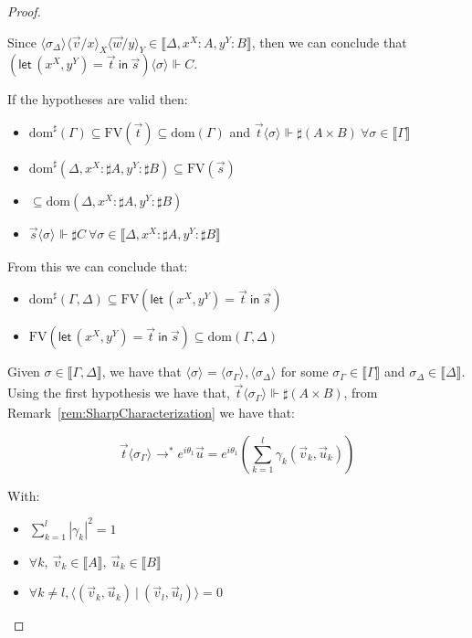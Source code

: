\documentclass[a4paper,UKenglish,numberwithinsect,pdfa,anonymous]{lipics-v2021}
\theoremstyle{restatestyle}
\newcommand\lra{\longrightarrow}
\newcommand\ansubst[2]{\ensuremath{\langle #1 \rangle_{#2}}}
\newcommand\dom[1]{\mathrm{dom}(#1)}
\newcommand\sdom[1]{\mathrm{dom}^{\sharp}(#1)}
\newcommand\FV[1]{\mathrm{FV}(#1)}
\def\scal#1#2{\langle{#1}~|~{#2}\rangle}
\def\Pair#1#2{(#1,#2)} %
\def\letkeyword{\mathsf{let}}
\def\inkeyword{\mathsf{in}}
\def\LetP#1#2#3#4#5#6{\letkeyword\,\Pair{#1^{#2}}{#3^{#4}}=#5~\inkeyword~#6}
\def\eval{\lra^*}
\def\sem#1{\llbracket#1\rrbracket}
\def\real{\Vdash}
\begin{document}
\begin{proof}
\begin{description}
    Since $\ansubst{\sigma_\Delta}{}\ansubst{\vec{v}/x}{X}\ansubst{\vec{w}/y}{Y}\in\sem{\Delta,{x}^{X}:A,{y}^Y:B}$, then we can conclude that $(\LetP{x}{X}{y}{Y}{\vec{t}}{\vec{s}})\ansubst{\sigma}{}\real C$.

    \item[LetTens] If the hypotheses are valid then:
    \begin{itemize}
        \item $\sdom{\Gamma}\subseteq \FV{\vec t} \subseteq \dom{\Gamma}$ and $\vec t \ansubst{\sigma}{}\Vdash \sharp(A\times B)\ \forall \sigma\in\sem\Gamma$
        \item $\sdom{\Delta, {x}^{X}:\sharp A, {y}^{Y}:\sharp B}\subseteq \FV{\vec s}$
        \item $\subseteq \dom{\Delta, {x}^{X}:\sharp A, {y}^{Y}:\sharp B}$
        \item $\vec s \ansubst{\sigma}{}\Vdash \sharp C\ \forall \sigma\in\sem{\Delta, {x}^{X}:\sharp A, {y}^{Y}:\sharp B}$
    \end{itemize}
    
    From this we can conclude that:
    \begin{itemize}
        \item $\sdom{\Gamma,\Delta}\subseteq\FV{\LetP{x}{X}{y}{Y}{\vec{t}}{\vec{s}}}$
        \item $\FV{\LetP{x}{X}{y}{Y}{\vec{t}}{\vec{s}}}\subseteq\dom{\Gamma,\Delta}$
    \end{itemize}
    
    Given $\sigma\in\sem{\Gamma,\Delta}$, we have that $\ansubst{\sigma}{}=\ansubst{\sigma_\Gamma}{},\ansubst{\sigma_\Delta}{}$ for some $\sigma_\Gamma\in\sem\Gamma$ and $\sigma_\Delta\in\sem\Delta$. Using the first hypothesis we have that, $\vec t\ansubst{\sigma_\Gamma}{}\real \sharp(A\times B)$, from Remark~\ref{rem:SharpCharacterization} we have that:
    
    \[\vec t\ansubst{\sigma_\Gamma}{}\eval e^{i\theta_1}\vec{u}=e^{i\theta_1}(\sum_{k=1}^{l} \gamma_k \Pair{\vec{v}_{k}}{\vec{u}_{k}})\] 
    
    With:
    \begin{itemize}
        \item $\sum_{k=1}^{l} |\gamma_k|^2 = 1$
        \item $\forall k,\ \vec{v}_{k}\in\sem{A},\ \vec{u}_{k}\in\sem{B}$
        \item $\forall k\neq l, \scal{\Pair{\vec{v}_{k}}{\vec{u}_{k}}}{\Pair{\vec{v}_{l}}{\vec{u}_{l}}}= 0$
    \end{itemize}
    

\end{description}
\end{proof}
\end{document}
